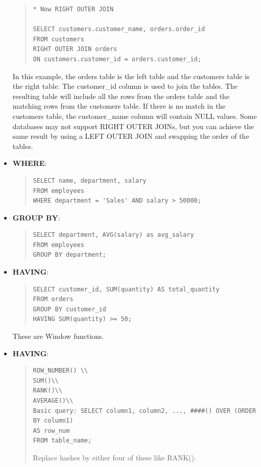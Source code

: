 \documentclass[11pt]{article}
\begin{document}
\begin{itemize}
\begin{quote}
\begin{verbatim}
* Now RIGHT OUTER JOIN

SELECT customers.customer_name, orders.order_id
FROM customers
RIGHT OUTER JOIN orders
ON customers.customer_id = orders.customer_id;
\end{verbatim}
\end{quote}
In this example, the orders table is the left table and the customers table is the right table. The customer\_id column is used to join the tables. The resulting table will include all the rows from the orders table and the matching rows from the customers table. If there is no match in the customers table, the customer\_name column will contain NULL values. Some databases may not support RIGHT OUTER JOINs, but you can achieve the same result by using a LEFT OUTER JOIN and swapping the order of the tables.


\item \textbf{WHERE}: 
\begin{quote}
\begin{verbatim}
SELECT name, department, salary
FROM employees
WHERE department = 'Sales' AND salary > 50000;
\end{verbatim}
\end{quote}



\item \textbf{GROUP BY}: 
\begin{quote}
\begin{verbatim}
SELECT department, AVG(salary) as avg_salary
FROM employees
GROUP BY department;
\end{verbatim}
\end{quote}


\item \textbf{HAVING}: 
\begin{quote}
\begin{verbatim}
SELECT customer_id, SUM(quantity) AS total_quantity
FROM orders
GROUP BY customer_id
HAVING SUM(quantity) >= 50;
\end{verbatim}
\end{quote}


These are Window functions. 
\item \textbf{HAVING}: 
\begin{quote}
\begin{verbatim}
ROW_NUMBER() \\
SUM()\\
RANK()\\
AVERAGE()\\
Basic query: SELECT column1, column2, ..., ####() OVER (ORDER BY column1)
AS row_num
FROM table_name;
\end{verbatim}
Replace hashes by either four of these like RANK(). 
\end{quote}



\end{itemize}
\end{document}
